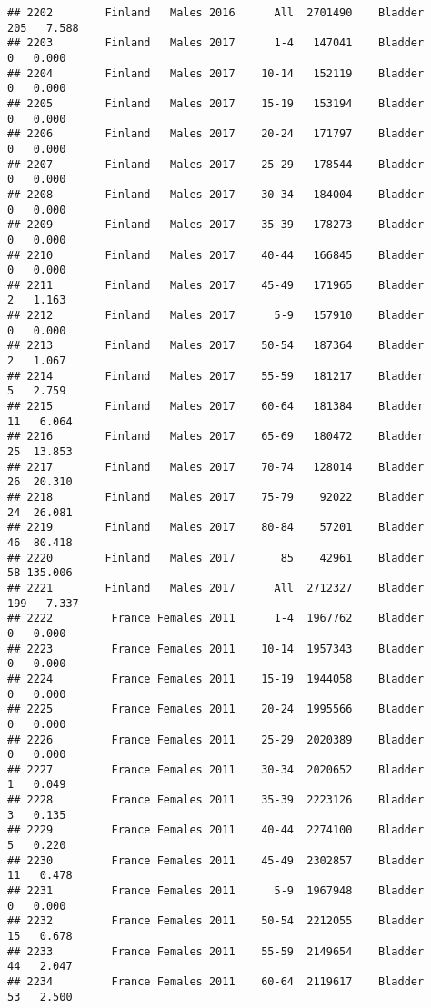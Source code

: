 \documentclass[
]{article}
\begin{document}
\begin{verbatim}
## 2202        Finland   Males 2016      All  2701490    Bladder    205   7.588
## 2203        Finland   Males 2017      1-4   147041    Bladder      0   0.000
## 2204        Finland   Males 2017    10-14   152119    Bladder      0   0.000
## 2205        Finland   Males 2017    15-19   153194    Bladder      0   0.000
## 2206        Finland   Males 2017    20-24   171797    Bladder      0   0.000
## 2207        Finland   Males 2017    25-29   178544    Bladder      0   0.000
## 2208        Finland   Males 2017    30-34   184004    Bladder      0   0.000
## 2209        Finland   Males 2017    35-39   178273    Bladder      0   0.000
## 2210        Finland   Males 2017    40-44   166845    Bladder      0   0.000
## 2211        Finland   Males 2017    45-49   171965    Bladder      2   1.163
## 2212        Finland   Males 2017      5-9   157910    Bladder      0   0.000
## 2213        Finland   Males 2017    50-54   187364    Bladder      2   1.067
## 2214        Finland   Males 2017    55-59   181217    Bladder      5   2.759
## 2215        Finland   Males 2017    60-64   181384    Bladder     11   6.064
## 2216        Finland   Males 2017    65-69   180472    Bladder     25  13.853
## 2217        Finland   Males 2017    70-74   128014    Bladder     26  20.310
## 2218        Finland   Males 2017    75-79    92022    Bladder     24  26.081
## 2219        Finland   Males 2017    80-84    57201    Bladder     46  80.418
## 2220        Finland   Males 2017       85    42961    Bladder     58 135.006
## 2221        Finland   Males 2017      All  2712327    Bladder    199   7.337
## 2222         France Females 2011      1-4  1967762    Bladder      0   0.000
## 2223         France Females 2011    10-14  1957343    Bladder      0   0.000
## 2224         France Females 2011    15-19  1944058    Bladder      0   0.000
## 2225         France Females 2011    20-24  1995566    Bladder      0   0.000
## 2226         France Females 2011    25-29  2020389    Bladder      0   0.000
## 2227         France Females 2011    30-34  2020652    Bladder      1   0.049
## 2228         France Females 2011    35-39  2223126    Bladder      3   0.135
## 2229         France Females 2011    40-44  2274100    Bladder      5   0.220
## 2230         France Females 2011    45-49  2302857    Bladder     11   0.478
## 2231         France Females 2011      5-9  1967948    Bladder      0   0.000
## 2232         France Females 2011    50-54  2212055    Bladder     15   0.678
## 2233         France Females 2011    55-59  2149654    Bladder     44   2.047
## 2234         France Females 2011    60-64  2119617    Bladder     53   2.500

\end{verbatim}
\end{document}
